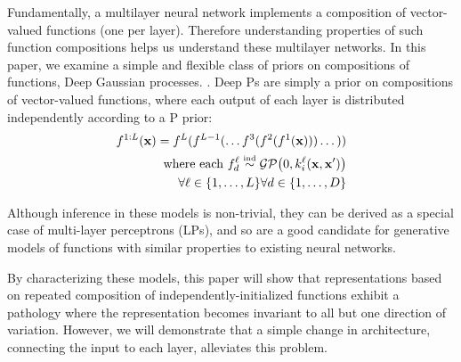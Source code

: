 \documentclass[twoside]{article}
\makeatletter
\newlength{\nonHumbleHeight}
\def\@humbleformat#1{{\settoheight{\nonHumbleHeight}{#1}\resizebox{!}{0.94\nonHumbleHeight}{#1}}}%
\def\humble#1{\@humbleformat{#1}}%
\newcommand{\gp}{{\humble GP}}
\newcommand{\MLP}{{\humble MLP}}
\makeatother
\begin{document}
Fundamentally, a multilayer neural network implements a composition of vector-valued functions (one per layer). 
Therefore understanding properties of such function compositions helps us understand these multilayer networks.
In this paper, we examine a simple and flexible class of priors on compositions of functions, 
Deep Gaussian processes. \citep{damianou2012deep}.  Deep \gp{}s are simply a prior on compositions of vector-valued functions, where each output of each layer is distributed independently according to a \gp{} prior:
%
\begin{align}
f^{1:L}(\vx) = f^L(f^{L-1}(\dots f^3(f^2(f^1(\vx)))\dots)) \\ 
\textnormal{ where each $f_d^\ell \simind \GPt{0}{k^\ell_i(\vx, \vx')}$} \\ \forall \ell \in \{1, \dots, L\} \forall d \in \{ 1, \dots, D \} \nonumber
\end{align}

Although inference in these models is non-trivial, they can be derived as a special case of multi-layer perceptrons (\MLP{}s), and so are a good candidate for generative models of functions with similar properties to existing neural networks.

By characterizing these models, this paper will show that representations based on repeated composition of independently-initialized functions exhibit a pathology where the representation becomes invariant to all but one direction of variation.  However, we will demonstrate that a simple change in architecture, connecting the input to each layer, alleviates this problem.


\end{document}

